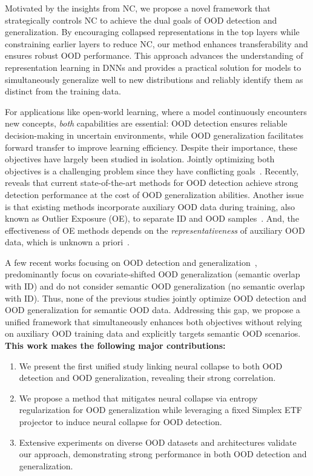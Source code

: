 Motivated by the insights from NC, we propose a novel framework that strategically controls NC to achieve the dual goals of OOD detection and generalization. By encouraging collapsed representations in the top layers while constraining earlier layers to reduce NC, our method enhances transferability and ensures robust OOD performance. This approach advances the understanding of representation learning in DNNs and provides a practical solution for models to simultaneously generalize well to new distributions and reliably identify them as distinct from the training data.



For applications like open-world learning, where a model continuously encounters new concepts, \textit{both} capabilities are essential: OOD detection ensures reliable decision-making in uncertain environments, while OOD generalization facilitates forward transfer to improve learning efficiency. Despite their importance, these objectives have largely been studied in isolation. 
Jointly optimizing both objectives is a challenging problem since they have conflicting goals~\cite{bai2023feed}.
Recently,~\citet{zhang2024best} reveals that current state-of-the-art methods for OOD detection achieve strong detection performance at the cost of OOD generalization abilities.
Another issue is that existing methods incorporate auxiliary OOD data during training, also known as Outlier Exposure (OE), to separate ID and OOD samples~\cite{hendrycks2018deep, wu2024pursuing, katz2022training}. And, the effectiveness of OE methods depends on the \emph{representativeness} of auxiliary OOD data, which is unknown a priori~\cite{roady2020improved}.

A few recent works focusing on OOD detection and generalization~\cite{zhang2024best, wang2024bridging, bai2023feed}, predominantly focus on covariate-shifted OOD generalization (semantic overlap with ID) and do not consider semantic OOD generalization (no semantic overlap with ID). Thus, none of the previous studies jointly optimize OOD detection and OOD generalization for semantic OOD data. Addressing this gap, we propose a unified framework that simultaneously enhances both objectives without relying on auxiliary OOD training data and explicitly targets semantic OOD scenarios.
\textbf{This work makes the following major contributions:}
\begin{enumerate}[noitemsep, nolistsep, leftmargin=*]
    \item We present the first unified study linking neural collapse to both OOD detection and OOD generalization, revealing their strong correlation.
    \item We propose a method that mitigates neural collapse via entropy regularization for OOD generalization while leveraging a fixed Simplex ETF projector to induce neural collapse for OOD detection.
    \item Extensive experiments on diverse OOD datasets and architectures validate our approach, demonstrating strong performance in both OOD detection and generalization.
\end{enumerate}








